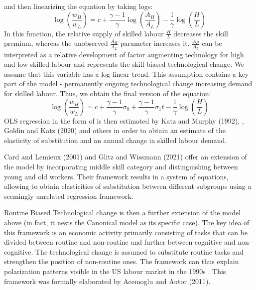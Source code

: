 \documentclass[11pt]{article}
\begin{document}
and then linearizing the equation by taking logs:
\[\log(\frac{w_{H}}{w_{L}}) = c + \frac{\gamma - 1}{\gamma}\log(\frac{A_{H}}{A_{L}}) - \frac{1}{\gamma}\log(\frac{H}{L})\]
In this function, the relative supply of skilled labour $\frac{H}{L}$ decreases the skill premium, whereas the unobserved $\frac{A_{H}}{A_{L}}$ parameter increases it. $\frac{A_{H}}{A_{L}}$ can be interpreted as a relative development of factor augmenting technology for high and low skilled labour and represents the skill-biased technological change. We assume that this variable has a log-linear trend. This assumption contains a key part of the model - permanently ongoing technological change increasing demand for skilled labour. Thus, we obtain the final version of the equation:
\begin{equation}
\label{eqn:STBC_regression_appendix}
\log(\frac{w_{H}}{w_{L}}) = c + \frac{\gamma - 1}{\gamma}\sigma_0 + \frac{\gamma - 1}{\gamma}\sigma_{1}t - \frac{1}{\gamma}\log(\frac{H}{L})
\end{equation}
OLS regression in the form of is then estimated by Katz and Murphy (1992), \citep{acemoglu2012does}, Goldin and Katz (2020) and others in order to obtain an estimate of the elasticity of substitution and an annual change in skilled labour demand.

Card and Lemieux (2001) and Glitz and Wissmann (2021) offer an extension of the model by incorporating middle skill category and distinguishing between young and old workers. Their framework results in a system of equations, allowing to obtain elasticities of substitution between different subgroups using a seemingly unrelated regression framework.

Routine Biased Technological change is then a further extension of the model above (in fact, it nests the Canonical model as its specific case). The key idea of this framework is an economic activity primarily consisting of tasks that can be divided between routine and non-routine and further between cognitive and non-cognitive. The technological change is assumed to substitute routine tasks and strengthen the position of non-routine ones. The framework can thus explain polarization patterns visible in the US labour market in the 1990s \citep{autor2014polanyi}. This framework was formally elaborated by Acemoglu and Autor (2011).
\end{document}
